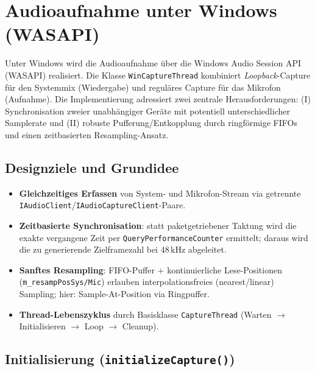 
\chapter{Audioaufnahme unter Windows (WASAPI)}
\label{chap:audio_windows}


Unter Windows wird die Audioaufnahme über die Windows Audio Session API (WASAPI) realisiert. Die Klasse \texttt{WinCaptureThread} kombiniert \emph{Loopback}-Capture für den Systemmix (Wiedergabe) und reguläres Capture für das Mikrofon (Aufnahme). Die Implementierung adressiert zwei zentrale Herausforderungen:
(I) Synchronisation zweier unabhängiger Geräte mit potentiell unterschiedlicher Samplerate und
(II) robuste Pufferung/Entkopplung durch ringförmige FIFOs und einen zeitbasierten Resampling-Ansatz.


\section{Designziele und Grundidee}
\label{sec:wasapi_ziele}

\begin{itemize}
    \item \textbf{Gleichzeitiges Erfassen} von System- und Mikrofon-Stream via getrennte  \texttt{IAudioClient}/\texttt{IAudioCaptureClient}-Paare.
    \item \textbf{Zeitbasierte Synchronisation}: statt paketgetriebener Taktung wird die exakte vergangene Zeit per \texttt{QueryPerformanceCounter} ermittelt; daraus wird die zu generierende Zielframezahl bei 48\,kHz abgeleitet.
    \item \textbf{Sanftes Resampling}: FIFO-Puffer + kontinuierliche Lese-Positionen     (\texttt{m\_resampPosSys/Mic}) erlauben interpolationsfreies (nearest/linear) Sampling; hier: Sample-At-Position via Ringpuffer.
    \item \textbf{Thread-Lebenszyklus} durch Basisklasse \texttt{CaptureThread} (Warten $\rightarrow$ Initialisieren $\rightarrow$ Loop $\rightarrow$ Cleanup).
\end{itemize}


\section{Initialisierung (\texttt{initializeCapture()})}
\label{sec:wasapi_init}

